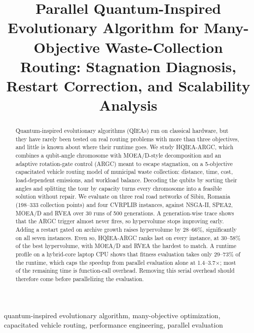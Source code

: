 \documentclass[conference]{IEEEtran}
\title{Parallel Quantum-Inspired Evolutionary Algorithm for Many-Objective
Waste-Collection Routing: Stagnation Diagnosis, Restart Correction, and
Scalability Analysis}
\author{\IEEEauthorblockN{Anonymous Authors}
\IEEEauthorblockA{Affiliation withheld for double-blind review}}
\begin{document}
\maketitle

\begin{abstract}
Quantum-inspired evolutionary algorithms (QIEAs) run on classical hardware, but
they have rarely been tested on real routing problems with more than three
objectives, and little is known about where their runtime goes. We study
HQIEA-ARGC, which combines a qubit-angle chromosome with MOEA/D-style
decomposition and an adaptive rotation-gate control (ARGC) meant to escape
stagnation, on a 5-objective capacitated vehicle routing model of municipal waste
collection: distance, time, cost, load-dependent emissions, and workload balance.
Decoding the qubits by sorting their angles and splitting the tour by capacity
turns every chromosome into a feasible solution without repair. We evaluate on
three real road networks of Sibiu, Romania (198--333 collection points) and four
CVRPLIB instances, against NSGA-II, SPEA2, MOEA/D and RVEA over 30 runs of 500
generations. A generation-wise trace shows that the ARGC trigger almost never
fires, so hypervolume stops improving early. Adding a restart gated on archive
growth raises hypervolume by 28--66\%, significantly on all seven instances. Even
so, HQIEA-ARGC ranks last on every instance, at 30--58\% of the best
hypervolume, with MOEA/D and RVEA the hardest to match. A runtime profile on a
hybrid-core laptop CPU shows that fitness evaluation takes only 29--73\% of the
runtime, which caps the speedup from parallel evaluation alone at
1.4--3.7$\times$; most of the remaining time is function-call overhead. Removing
this serial overhead should therefore come before parallelizing the evaluation.
\end{abstract}

\begin{IEEEkeywords}
quantum-inspired evolutionary algorithm, many-objective optimization,
capacitated vehicle routing, performance engineering, parallel evaluation
\end{IEEEkeywords}
\end{document}
